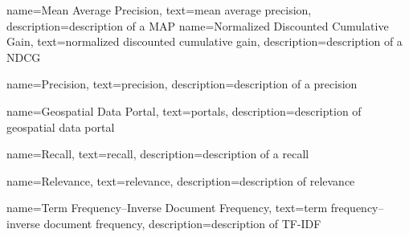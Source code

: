 {
    name=Mean Average Precision,
    text=mean average precision,
    description=description of a MAP
}
{
    name=Normalized Discounted Cumulative Gain,
    text=normalized discounted cumulative gain,
    description=description of a NDCG
}

{
    name=Precision,
    text=precision,
    description=description of a precision
}

{
    name=Geospatial Data Portal,
    text=portals,
    description=description of geospatial data portal
}

{
    name=Recall,
    text=recall,
    description=description of a recall
}

{
    name=Relevance,
    text=relevance,
    description=description of relevance
}

{
    name=Term Frequency–Inverse Document Frequency,
    text=term frequency–inverse document frequency,
    description=description of TF-IDF
}
